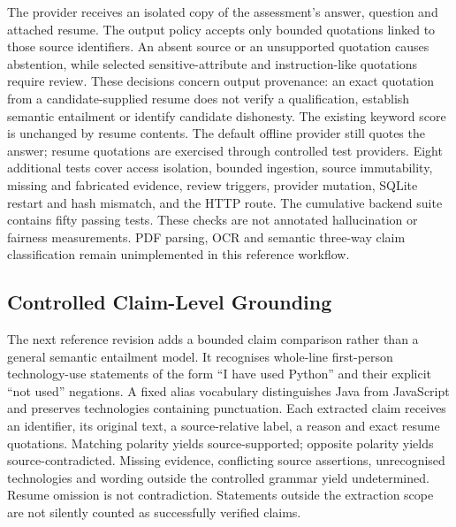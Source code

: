 \documentclass[conference]{IEEEtran}
\begin{document}
The provider receives an isolated copy of the assessment's answer, question and attached resume. The output policy accepts only bounded quotations linked to those source identifiers. An absent source or an unsupported quotation causes abstention, while selected sensitive-attribute and instruction-like quotations require review. These decisions concern output provenance: an exact quotation from a candidate-supplied resume does not verify a qualification, establish semantic entailment or identify candidate dishonesty. The existing keyword score is unchanged by resume contents. The default offline provider still quotes the answer; resume quotations are exercised through controlled test providers. Eight additional tests cover access isolation, bounded ingestion, source immutability, missing and fabricated evidence, review triggers, provider mutation, SQLite restart and hash mismatch, and the HTTP route. The cumulative backend suite contains fifty passing tests. These checks are not annotated hallucination or fairness measurements. PDF parsing, OCR and semantic three-way claim classification remain unimplemented in this reference workflow.

\subsection{Controlled Claim-Level Grounding}

The next reference revision adds a bounded claim comparison rather than a general semantic entailment model. It recognises whole-line first-person technology-use statements of the form ``I have used Python'' and their explicit ``not used'' negations. A fixed alias vocabulary distinguishes Java from JavaScript and preserves technologies containing punctuation. Each extracted claim receives an identifier, its original text, a source-relative label, a reason and exact resume quotations. Matching polarity yields source-supported; opposite polarity yields source-contradicted. Missing evidence, conflicting source assertions, unrecognised technologies and wording outside the controlled grammar yield undetermined. Resume omission is not contradiction. Statements outside the extraction scope are not silently counted as successfully verified claims.
\end{document}
